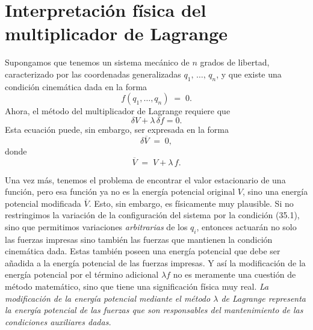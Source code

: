 \section{Interpretación física del multiplicador de Lagrange}

Supongamos que tenemos un sistema mecánico de $n$ grados de libertad, caracterizado por las coordenadas generalizadas $q_1,\, \ldots,\, q_n$, y que existe una condición cinemática dada en la forma
\begin{equation}
f(q_1, \ldots, q_n) \;=\; 0. \tag{35.1}
\end{equation}
Ahora, el método del multiplicador de Lagrange requiere que
\begin{equation}
\delta V + \lambda\,\delta f = 0. \tag{35.2}
\end{equation}
Esta ecuación puede, sin embargo, ser expresada en la forma
\begin{equation}
\delta\overline{V} \;=\; 0, \tag{35.3}
\end{equation}
donde
\begin{equation}
\overline{V} \;=\; V + \lambda\,f. \tag{35.4}
\end{equation}

Una vez más, tenemos el problema de encontrar el valor estacionario de una función, pero esa función ya no es la energía potencial original $V$, sino una energía potencial modificada $\overline{V}$. Esto, sin embargo, es físicamente muy plausible. Si no restringimos la variación de la configuración del sistema por la condición (35.1), sino que permitimos variaciones \emph{arbitrarias} de los $q_i$, entonces actuarán no solo las fuerzas impresas sino también las fuerzas que mantienen la condición cinemática dada. Estas también poseen una energía potencial que debe ser añadida a la energía potencial de las fuerzas impresas. Y así la modificación de la energía potencial por el término adicional $\lambda f$ no es meramente una cuestión de método matemático, sino que tiene una significación física muy real. \emph{La modificación de la energía potencial mediante el método $\lambda$ de Lagrange representa la energía potencial de las fuerzas que son responsables del mantenimiento de las condiciones auxiliares dadas.}

